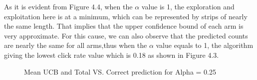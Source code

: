 As it is evident from Figure 4.4, when the $\alpha$ value is 1, the exploration and exploitation here is at a minimum, which can be represented by strips of nearly the same length. That implies that the upper confidence bound of each arm is very approximate. For this cause, we can also observe that the predicted counts are nearly the same for all arms,thus when the $\alpha$ value equals to 1, the algorithm giving the lowest click rate value which is 0.18 as shown in Figure 4.3.
\begin{figure}[htbp]
\centering
{}%
%
\centering
\caption{ Mean UCB and Total VS. Correct prediction for
Alpha = 0.25}
\end{figure}  
